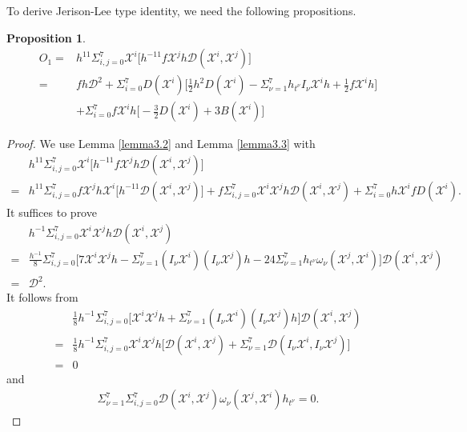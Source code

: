 \documentclass[reqno,12pt]{amsart}
\numberwithin{equation}{section}
\theoremstyle{plain}
\newtheorem{proposition}[theorem]{Proposition}
\theoremstyle{definition}
\begin{document}
 To derive Jerison-Lee type identity, we need the following propositions.        
\begin{proposition}
    \begin{equation}
    \begin{aligned}
O_1=&h^{11}\Sigma_{i,j=0}^7\mathscr{X}^i\bigg[h^{-11}f\mathscr{X}^j h\mathcal{D}(\mathscr{X}^i,\mathscr{X}^j)\bigg]\\=& fh\mathcal{D}^2+\Sigma_{i=0}^7D(\mathscr{X}^i)\bigg[\frac{1}{2}h^2D(\mathscr{X}^i)-\Sigma_{\nu=1}^7h_{t^\nu}I_\nu \mathscr{X}^i h+\frac{1}{2}f\mathscr{X}^i h\bigg]\\&+\Sigma_{i=0}^7 f\mathscr{X}^i h\bigg[-\frac{3}{2}D(\mathscr{X}^i)+3B(\mathscr{X}^i)\bigg] 
\end{aligned}
    \end{equation}
\end{proposition}
\begin{proof}
We use Lemma \ref{lemma3.2} and Lemma \ref{lemma3.3} with
    \begin{equation*}
    \begin{aligned}
&h^{11}\Sigma_{i,j=0}^7\mathscr{X}^i\bigg[h^{-11}f\mathscr{X}^j h\mathcal{D}(\mathscr{X}^i,\mathscr{X}^j)\bigg]\\=&h^{11}\Sigma_{i,j=0}^7     f\mathscr{X}^j h\mathscr{X}^i\bigg[h^{-11}\mathcal{D}(\mathscr{X}^i,\mathscr{X}^j)\bigg]+f\Sigma_{i,j=0}^7\mathscr{X}^i\mathscr{X}^j h \mathcal{D}(\mathscr{X}^i,\mathscr{X}^j)+\Sigma_{i=0}^7h\mathscr{X}^if D(\mathscr{X}^i).
\end{aligned}
    \end{equation*}
    It suffices to prove
\begin{align*}
    &h^{-1}\Sigma_{i,j=0}^7\mathscr{X}^i\mathscr{X}^j h \mathcal{D}(\mathscr{X}^i,\mathscr{X}^j)\\=&\frac{h^{-1}}{8}\Sigma_{i,j=0}^7\bigg[7\mathscr{X}^i\mathscr{X}^j h-\Sigma_{\nu=1}^7(I_\nu \mathscr{X}^i )(I_\nu \mathscr{X}^j)h-24\Sigma_{\nu=1}^7h_{t^\nu}\omega_\nu (\mathscr{X}^j,\mathscr{X}^i) \bigg]\mathcal{D}(\mathscr{X}^i,\mathscr{X}^j)    \\=&\mathcal{D}^2.
    \end{align*}    
  It follows from
  \begin{align*}
       &\frac{1}{8}h^{-1}\Sigma_{i,j=0}^7\bigg[\mathscr{X}^i\mathscr{X}^j h+
       \Sigma_{\nu=1}^7(I_\nu \mathscr{X}^i )(I_\nu \mathscr{X}^j)h       
       \bigg]\mathcal{D}(\mathscr{X}^i,\mathscr{X}^j)\\=&\frac{1}{8}h^{-1}\Sigma_{i,j=0}^7 \mathscr{X}^i\mathscr{X}^jh\bigg[\mathcal{D}(\mathscr{X}^i,\mathscr{X}^j)+\Sigma_{\nu=1}^7\mathcal{D}(I_\nu \mathscr{X}^i,I_\nu \mathscr{X}^j)    \bigg]\\=&0       
       \end{align*}
       and
       \begin{align*}
\Sigma_{\nu=1}^7\Sigma_{i,j=0}^7\mathcal{D}(\mathscr{X}^i,\mathscr{X}^j)\omega_\nu(\mathscr{X}^j,\mathscr{X}^i)h_{t^\nu}=0.
\end{align*}

\end{proof}
\end{document}
